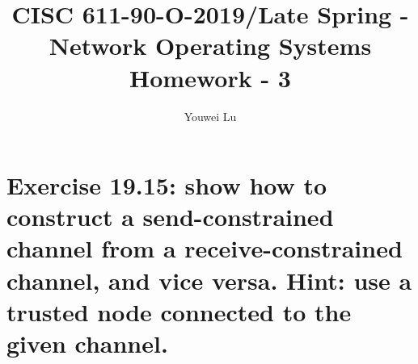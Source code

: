 \documentclass[doc,natbib,12pt]{article}
\title{CISC 611-90-O-2019/Late Spring - Network Operating Systems \\ Homework - 3}
\author{Youwei Lu}
\date{}
\begin{document}
	\maketitle
	
	
	\section*{Exercise 19.15: show how to construct a send-constrained channel from a receive-constrained channel, and vice versa. Hint: use a trusted node connected to the given channel.}
	
	
	
	
\end{document}
